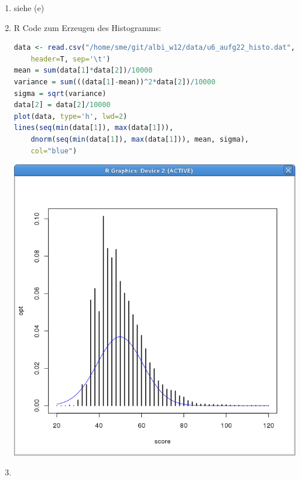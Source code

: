 \documentclass{homework}
\begin{document}
\begin{enumerate}
\begin{enumerate}
\item siehe (e)
\item 
	R Code zum Erzeugen des Histogramms:
\begin{lstlisting}[language=r]
data <- read.csv("/home/sme/git/albi_w12/data/u6_aufg22_histo.dat",
	header=T, sep='\t')
mean = sum(data[1]*data[2])/10000
variance = sum(((data[1]-mean))^2*data[2])/10000
sigma = sqrt(variance)
data[2] = data[2]/10000
plot(data, type='h', lwd=2)
lines(seq(min(data[1]), max(data[1])),
	dnorm(seq(min(data[1]), max(data[1])), mean, sigma),
	col="blue")
\end{lstlisting}
\includegraphics[scale=0.5]{u6_aufg22.png}
\item 
\end{enumerate}



\end{enumerate}
\end{document}
